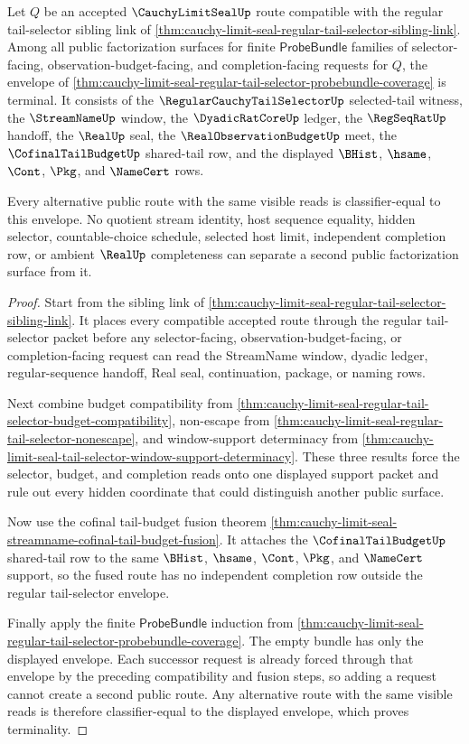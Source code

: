 \begin{theorem}
\label{thm:cauchy-limit-seal-probebundle-envelope-terminality}
Let $Q$ be an accepted $\CauchyLimitSealUp$ route compatible with the regular tail-selector sibling link of \autoref{thm:cauchy-limit-seal-regular-tail-selector-sibling-link}. Among all public factorization surfaces for finite $\mathsf{ProbeBundle}$ families of selector-facing, observation-budget-facing, and completion-facing requests for $Q$, the envelope of \autoref{thm:cauchy-limit-seal-regular-tail-selector-probebundle-coverage} is terminal. It consists of the $\RegularCauchyTailSelectorUp$ selected-tail witness, the $\StreamNameUp$ window, the $\DyadicRatCoreUp$ ledger, the $\RegSeqRatUp$ handoff, the $\RealUp$ seal, the $\RealObservationBudgetUp$ meet, the $\CofinalTailBudgetUp$ shared-tail row, and the displayed $\BHist$, $\hsame$, $\Cont$, $\Pkg$, and $\NameCert$ rows.

Every alternative public route with the same visible reads is classifier-equal to this envelope. No quotient stream identity, host sequence equality, hidden selector, countable-choice schedule, selected host limit, independent completion row, or ambient $\RealUp$ completeness can separate a second public factorization surface from it.
\end{theorem}
\begin{proof}
Start from the sibling link of \autoref{thm:cauchy-limit-seal-regular-tail-selector-sibling-link}. It places every compatible accepted route through the regular tail-selector packet before any selector-facing, observation-budget-facing, or completion-facing request can read the StreamName window, dyadic ledger, regular-sequence handoff, Real seal, continuation, package, or naming rows.

Next combine budget compatibility from \autoref{thm:cauchy-limit-seal-regular-tail-selector-budget-compatibility}, non-escape from \autoref{thm:cauchy-limit-seal-regular-tail-selector-nonescape}, and window-support determinacy from \autoref{thm:cauchy-limit-seal-tail-selector-window-support-determinacy}. These three results force the selector, budget, and completion reads onto one displayed support packet and rule out every hidden coordinate that could distinguish another public surface.

Now use the cofinal tail-budget fusion theorem \autoref{thm:cauchy-limit-seal-streamname-cofinal-tail-budget-fusion}. It attaches the $\CofinalTailBudgetUp$ shared-tail row to the same $\BHist$, $\hsame$, $\Cont$, $\Pkg$, and $\NameCert$ support, so the fused route has no independent completion row outside the regular tail-selector envelope.

Finally apply the finite $\mathsf{ProbeBundle}$ induction from \autoref{thm:cauchy-limit-seal-regular-tail-selector-probebundle-coverage}. The empty bundle has only the displayed envelope. Each successor request is already forced through that envelope by the preceding compatibility and fusion steps, so adding a request cannot create a second public route. Any alternative route with the same visible reads is therefore classifier-equal to the displayed envelope, which proves terminality.
\end{proof}

